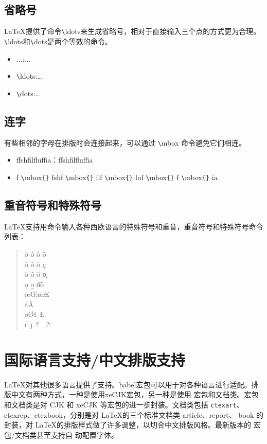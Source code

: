 \documentclass[UTF8]{ctexart}
\begin{document}
\subsection{省略号}
\LaTeX 提供了命令\texttt{\textbackslash}ldots来生成省略号，相对于直接输入三个点的方式更为合理。\texttt{\textbackslash}ldots和\texttt{\textbackslash}dots是两个等效的命令。
\begin{itemize}
  \item ...:...
  \item \texttt{\textbackslash}ldots:\ldots
  \item \texttt{\textbackslash}dots:\dots
\end{itemize}
\subsection{连字}
有些相邻的字母在排版时会连接起来，可以通过 \texttt{\textbackslash}mbox{} 命令避免它们相连。
\begin{itemize}
  \item f\mbox{}fshf\mbox{}ilf\mbox{}luf\mbox{}f\mbox{}ia：ffshfilfluffia
  \item f \texttt{\textbackslash}mbox\texttt{\{}\texttt{\}} fshf \texttt{\textbackslash}mbox\texttt{\{}\texttt{\}} ilf \texttt{\textbackslash}mbox\texttt{\{}\texttt{\}}  luf \texttt{\textbackslash}mbox\texttt{\{}\texttt{\}}
  f \texttt{\textbackslash}mbox\texttt{\{}\texttt{\}} ia
\end{itemize}
\subsection{重音符号和特殊符号}
\LaTeX 支持用命令输入各种西欧语言的特殊符号和重音，重音符号和特殊符号命令列表：
\begin{quote}
  \`o  \qquad \'o  \qquad \^o  \qquad \~o \\
  \=o  \qquad \.o  \qquad \"o  \qquad \c c \\
  \u o \qquad \v o \qquad \H o \qquad \c o \\
  \d o \qquad \b o \qquad \t oo \\
  \oe  \qquad \OE  \qquad \ae  \qquad \AE \\
  \aa  \qquad \AA \\
  \o   \qquad  \O  \qquad \l  ~\qquad \L \\
  \i   ~\qquad  \j  ~\qquad  !`  ~\qquad ?` \\
\end{quote}

\section{国际语言支持/中文排版支持}
\LaTeX 对其他很多语言提供了支持。babel宏包可以用于对各种语言进行适配。排版中文有两种方式，一种是使用xeCJK宏包，另一种是使用 \CTeX 宏包和文档类。\CTeX 宏包和文档类是对 CJK 和 xeCJK 等宏包的进一步封装。文档类包括 \texttt{ctexart}、
ctexrep、ctexbook，分别是对 \LaTeX 的三个标准文档类 article、report、
book 的封装，对 \LaTeX 的排版样式做了许多调整，以切合中文排版风格。最新版本的 \CTeX 宏包/文档类甚至支持自
动配置字体。
\end{document}
